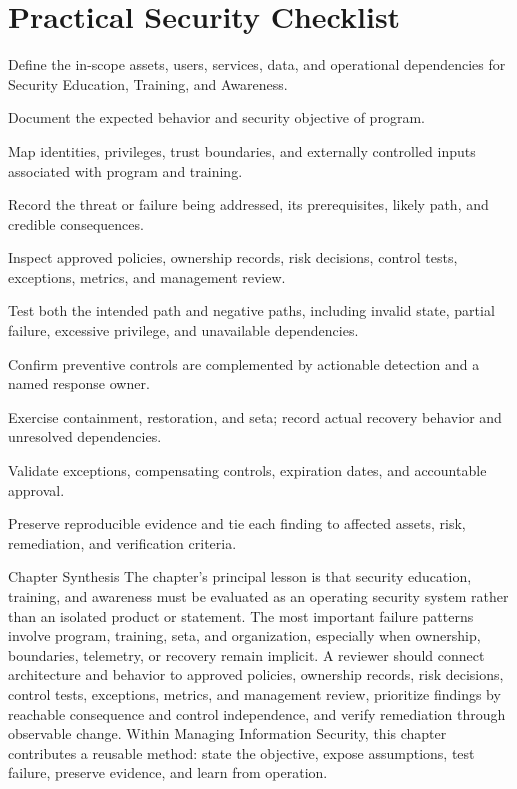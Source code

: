 \documentclass[11pt,letterpaper]{article}
\begin{document}
\section*{Practical Security Checklist}
\begin{CornellChecklist}
\item Define the in-scope assets, users, services, data, and operational dependencies for Security Education, Training, and Awareness.
\item Document the expected behavior and security objective of program.
\item Map identities, privileges, trust boundaries, and externally controlled inputs associated with program and training.
\item Record the threat or failure being addressed, its prerequisites, likely path, and credible consequences.
\item Inspect approved policies, ownership records, risk decisions, control tests, exceptions, metrics, and management review.
\item Test both the intended path and negative paths, including invalid state, partial failure, excessive privilege, and unavailable dependencies.
\item Confirm preventive controls are complemented by actionable detection and a named response owner.
\item Exercise containment, restoration, and seta; record actual recovery behavior and unresolved dependencies.
\item Validate exceptions, compensating controls, expiration dates, and accountable approval.
\item Preserve reproducible evidence and tie each finding to affected assets, risk, remediation, and verification criteria.
\end{CornellChecklist}
\begin{CornellSummaryBox}{Chapter Synthesis}
The chapter's principal lesson is that security education, training, and awareness must be evaluated as an operating security system rather than an isolated product or statement. The most important failure patterns involve program, training, seta, and organization, especially when ownership, boundaries, telemetry, or recovery remain implicit. A reviewer should connect architecture and behavior to approved policies, ownership records, risk decisions, control tests, exceptions, metrics, and management review, prioritize findings by reachable consequence and control independence, and verify remediation through observable change. Within Managing Information Security, this chapter contributes a reusable method: state the objective, expose assumptions, test failure, preserve evidence, and learn from operation.
\end{CornellSummaryBox}
\end{document}
